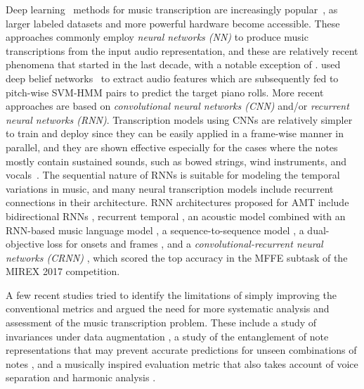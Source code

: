 

Deep learning~\cite{lecun2015deeplearning} methods for music transcription are increasingly popular~\cite{benetos2019amt}, as larger labeled datasets and more powerful hardware become accessible.
These approaches commonly employ \textit{neural networks (NN)} to produce music transcriptions from the input audio representation, and these are relatively recent phenomena that started in the last decade, with a notable exception of .
 used deep belief networks~\cite{hinton2006dbn} to extract audio features which are subsequently fed to pitch-wise SVM-HMM pairs to predict the target piano rolls.
More recent approaches are based on \textit{convolutional neural networks (CNN)} and/or \textit{recurrent neural networks (RNN)}.
Transcription models using CNNs are relatively simpler to train and deploy since they can be easily applied in a frame-wise manner in parallel, and they are shown effective especially for the cases where the notes mostly contain sustained sounds, such as bowed strings, wind instruments, and vocals~\cite{kelz2016framewise,bittner2017deepsalience}.
The sequential nature of RNNs is suitable for modeling the temporal variations in music, and many neural transcription models include recurrent connections in their architecture.
RNN architectures proposed for AMT include bidirectional RNNs \cite{bock2012rnn}, recurrent temporal  \cite{boulangerlewandowski2012temporal}, an acoustic model combined with an RNN-based music language model \cite{sigtia2015hybrid,sigtia2016endtoend,wang2018mlm},
a sequence-to-sequence model \cite{ullrich2017seq2seq},
a dual-objective loss for onsets and frames \cite{hawthorne2018onsetsframes},
and a \textit{convolutional-recurrent neural networks (CRNN)} \cite{thome2017crnn}, which scored the top accuracy in the MFFE subtask of the MIREX 2017 competition.



A few recent studies tried to identify the limitations of simply improving the conventional metrics and argued the need for more systematic analysis and assessment of the music transcription problem.
These include a study of invariances under data augmentation \cite{thickstun2017invariances}, a study of the entanglement of note representations that may prevent accurate predictions for unseen combinations of notes \cite{kelz2017entanglement}, and a musically inspired evaluation metric that also takes account of voice separation and harmonic analysis \cite{mcleod2018eval}.



